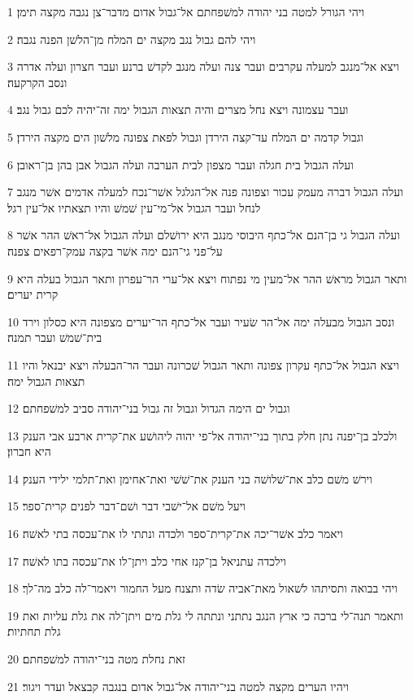 \par 1 ויהי הגורל למטה בני יהודה למשׁפחתם אל־גבול אדום מדבר־צן נגבה מקצה תימן׃
\par 2 ויהי להם גבול נגב מקצה ים המלח מן־הלשׁן הפנה נגבה׃
\par 3 ויצא אל־מנגב למעלה עקרבים ועבר צנה ועלה מנגב לקדשׁ ברנע ועבר חצרון ועלה אדרה ונסב הקרקעה׃
\par 4 ועבר עצמונה ויצא נחל מצרים והיה תצאות הגבול ימה זה־יהיה לכם גבול נגב׃
\par 5 וגבול קדמה ים המלח עד־קצה הירדן וגבול לפאת צפונה מלשׁון הים מקצה הירדן׃
\par 6 ועלה הגבול בית חגלה ועבר מצפון לבית הערבה ועלה הגבול אבן בהן בן־ראובן׃
\par 7 ועלה הגבול דברה מעמק עכור וצפונה פנה אל־הגלגל אשׁר־נכח למעלה אדמים אשׁר מנגב לנחל ועבר הגבול אל־מי־עין שׁמשׁ והיו תצאתיו אל־עין רגל׃
\par 8 ועלה הגבול גי בן־הנם אל־כתף היבוסי מנגב היא ירושׁלם ועלה הגבול אל־ראשׁ ההר אשׁר על־פני גי־הנם ימה אשׁר בקצה עמק־רפאים צפנה׃
\par 9 ותאר הגבול מראשׁ ההר אל־מעין מי נפתוח ויצא אל־ערי הר־עפרון ותאר הגבול בעלה היא קרית יערים׃
\par 10 ונסב הגבול מבעלה ימה אל־הר שׂעיר ועבר אל־כתף הר־יערים מצפונה היא כסלון וירד בית־שׁמשׁ ועבר תמנה׃
\par 11 ויצא הגבול אל־כתף עקרון צפונה ותאר הגבול שׁכרונה ועבר הר־הבעלה ויצא יבנאל והיו תצאות הגבול ימה׃
\par 12 וגבול ים הימה הגדול וגבול זה גבול בני־יהודה סביב למשׁפחתם׃
\par 13 ולכלב בן־יפנה נתן חלק בתוך בני־יהודה אל־פי יהוה ליהושׁע את־קרית ארבע אבי הענק היא חברון׃
\par 14 וירשׁ משׁם כלב את־שׁלושׁה בני הענק את־שׁשׁי ואת־אחימן ואת־תלמי ילידי הענק׃
\par 15 ויעל משׁם אל־ישׁבי דבר ושׁם־דבר לפנים קרית־ספר׃
\par 16 ויאמר כלב אשׁר־יכה את־קרית־ספר ולכדה ונתתי לו את־עכסה בתי לאשׁה׃
\par 17 וילכדה עתניאל בן־קנז אחי כלב ויתן־לו את־עכסה בתו לאשׁה׃
\par 18 ויהי בבואה ותסיתהו לשׁאול מאת־אביה שׂדה ותצנח מעל החמור ויאמר־לה כלב מה־לך׃
\par 19 ותאמר תנה־לי ברכה כי ארץ הנגב נתתני ונתתה לי גלת מים ויתן־לה את גלת עליות ואת גלת תחתיות׃
\par 20 זאת נחלת מטה בני־יהודה למשׁפחתם׃
\par 21 ויהיו הערים מקצה למטה בני־יהודה אל־גבול אדום בנגבה קבצאל ועדר ויגור׃
